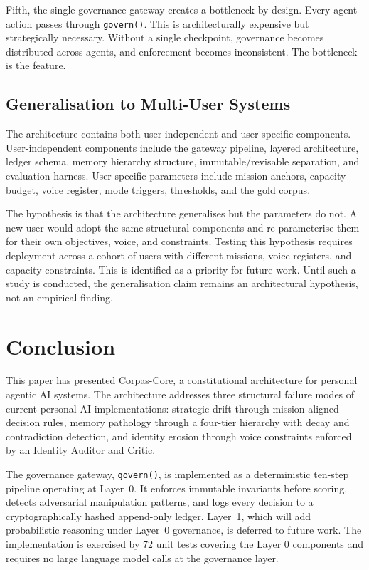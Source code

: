 \documentclass[11pt,a4paper]{article}
\begin{document}
Fifth, the single governance gateway creates a bottleneck by design. Every agent action passes through \texttt{govern()}. This is architecturally expensive but strategically necessary. Without a single checkpoint, governance becomes distributed across agents, and enforcement becomes inconsistent. The bottleneck is the feature.

\subsection{Generalisation to Multi-User Systems}

The architecture contains both user-independent and user-specific components. User-independent components include the gateway pipeline, layered architecture, ledger schema, memory hierarchy structure, immutable/revisable separation, and evaluation harness. User-specific parameters include mission anchors, capacity budget, voice register, mode triggers, thresholds, and the gold corpus.

The hypothesis is that the architecture generalises but the parameters do not. A new user would adopt the same structural components and re-parameterise them for their own objectives, voice, and constraints. Testing this hypothesis requires deployment across a cohort of users with different missions, voice registers, and capacity constraints. This is identified as a priority for future work. Until such a study is conducted, the generalisation claim remains an architectural hypothesis, not an empirical finding.

\section{Conclusion}

This paper has presented Corpas-Core, a constitutional architecture for personal agentic AI systems. The architecture addresses three structural failure modes of current personal AI implementations: strategic drift through mission-aligned decision rules, memory pathology through a four-tier hierarchy with decay and contradiction detection, and identity erosion through voice constraints enforced by an Identity Auditor and Critic.

The governance gateway, \texttt{govern()}, is implemented as a deterministic ten-step pipeline operating at Layer~0. It enforces immutable invariants before scoring, detects adversarial manipulation patterns, and logs every decision to a cryptographically hashed append-only ledger. Layer~1, which will add probabilistic reasoning under Layer~0 governance, is deferred to future work. The implementation is exercised by 72 unit tests covering the Layer 0 components and requires no large language model calls at the governance layer.
\end{document}
